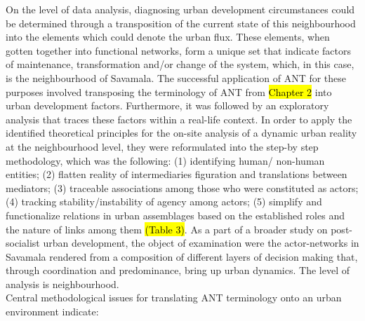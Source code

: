 \documentclass[11pt]{report}
\begin{document}
On the level of data analysis, diagnosing urban development circumstances could be determined through a transposition of the current state of this neighbourhood into the elements which could denote the urban flux. These elements, when gotten together into functional networks, form a unique set that indicate factors of maintenance, transformation and/or change of the system, which, in this case, is the neighbourhood of Savamala. The successful application of ANT for these purposes involved transposing the terminology of ANT from \hl{Chapter 2} into urban development factors. Furthermore, it was followed by an exploratory analysis that traces these factors within a real-life context. In order to apply the identified theoretical principles for the on-site analysis of a dynamic urban reality at the neighbourhood level, they were reformulated into the step-by step methodology, which was the following: (1) identifying human/ non-human entities; (2) flatten reality of intermediaries figuration and translations between mediators; (3) traceable associations among those who were constituted as actors; (4) tracking stability/instability of agency among actors; (5) simplify and functionalize relations in urban assemblages based on the established roles and the nature of links among them \hl{(Table 3)}. As a part of a broader study on post-socialist urban development, the object of examination were the actor-networks in Savamala rendered from a composition of different layers of decision making that, through coordination and predominance, bring up urban dynamics. The level of analysis is neighbourhood. 
\\
Central methodological issues for translating ANT terminology onto an urban environment indicate: 
\end{document}
